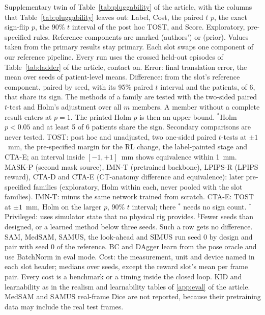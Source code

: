 
\begin{table}[tp]
\renewcommand{\baselinestretch}{1}\scriptsize
\caption{Supplementary twin of Table~\ref{tab:pluggability} of the article, with the columns that Table~\ref{tab:pluggability} leaves out: Label, Cost, the paired $t$ $p$, the exact sign-flip $p$, the 90\% $t$ interval of the post hoc TOST, and Score. Exploratory, pre-specified rules. Reference components are marked (authors') or (prior). Values taken from the primary results stay primary. Each slot swaps one component of our reference pipeline. Every run uses the crossed held-out episodes of Table~\ref{tab:ladder} of the article, contact on. Error: final translation error, the mean over seeds of patient-level means. Difference: from the slot's reference component, paired by seed, with its 95\% paired $t$ interval and the patients, of 6, that share its sign. The methods of a family are tested with the two-sided paired $t$-test and Holm's adjustment over all $m$ members. A member without a complete result enters at $p = 1$. The printed Holm $p$ is then an upper bound. $^{\ast}$Holm $p < 0.05$ and at least 5 of 6 patients share the sign. Secondary comparisons are never tested. TOST: post hoc and unadjusted, two one-sided paired $t$-tests at $\pm 1$~mm, the pre-specified margin for the RL change, the label-painted stage and CTA-E; an interval inside $[-1, +1]$~mm shows equivalence within 1~mm. MASK-P (second mask source), IMN-T (pretrained backbone), LPIPS-R (LPIPS reward), CTA-D and CTA-E (CT-anatomy difference and equivalence): later pre-specified families (exploratory, Holm within each, never pooled with the slot families). IMN-T: minus the same network trained from scratch. CTA-E: TOST at $\pm 1$~mm, Holm on the larger $p$, 90\% $t$ interval; there $^{\ast}$ needs no sign count. $^{\dagger}$Privileged: uses simulator state that no physical rig provides. $^{\ddagger}$Fewer seeds than designed, or a learned method below three seeds. Such a row gets no difference. SAM, MedSAM, SAMUS, the look-ahead and SIMUS run seed 0 by design and pair with seed 0 of the reference. BC and DAgger learn from the pose oracle and use BatchNorm in eval mode. Cost: the measurement, unit and device named in each slot header; medians over seeds, except the reward slot's mean per frame pair. Every cost is a benchmark or a timing inside the closed loop. KID and learnability as in the realism and learnability tables of \ref{app:eval} of the article. MedSAM and SAMUS real-frame Dice are not reported, because their pretraining data may include the real test frames.}
\label{tab:pluggability-twin}

\end{table}

